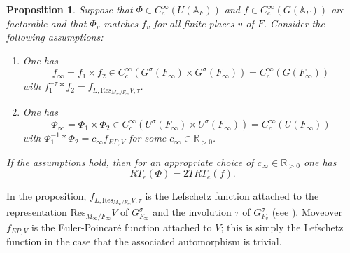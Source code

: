 \documentclass[12pt]{amsart}
\newtheorem{prop}[thm]{Proposition}
\theoremstyle{remark}
\numberwithin{equation}{section}
\newcommand{\A}{\mathbb{A}}
\newcommand{\RR}{\mathbb{R}}
\theoremstyle{definition}
\numberwithin{equation}{subsection}
\begin{document}
\begin{prop} \label{prop-form-compar} Suppose that $\Phi \in C_{c}^{\infty}(U(\A_F))$ and
$f \in C_c^{\infty}(G(\A_F))$ are factorable and that $\Phi_v$ matches $f_v$ for all finite places $v$ of $F$.
 Consider the following assumptions:
\begin{enumerate}
\item
One has
$$
f_{\infty}=f_1 \times f_2  \in C^{\infty}_c(G^{\sigma}(F_{\infty}) \times G^{\sigma}(F_{\infty}))= C_c^{\infty}(G(F_{\infty}))
$$
with $f_1^{-\tau}*f_2=f_{L,\mathrm{Res}_{M_{\infty}/F_{\infty}}V,\tau}$.

\item One has
$$
\Phi_{\infty}=\Phi_1 \times \Phi_2 \in C^{\infty}_c(U^{\sigma}(F_{\infty}) \times U^{\sigma}(F_{\infty}))=C_c^{\infty}(U(F_{\infty}))
$$
with $\Phi_1^{-1}*\Phi_2=c_{\infty}f_{EP,V}$ for some $c_{\infty} \in \RR_{>0}$.
\end{enumerate}
If the assumptions hold, then for an appropriate choice of $c_{\infty} \in \RR_{>0}$ one has
$$
RT_e(\Phi)=2TRT_e(f).
$$
\end{prop}
\noindent In the proposition, $f_{L,\mathrm{Res}_{M_{\infty}/F_{\infty}}V,\tau}$ is the Lefschetz function attached to the representation $\mathrm{Res}_{M_{\infty}/F_{\infty}}V$ of $G^{\sigma}_{F_{\infty}}$ and the involution $\tau$ of $G^{\sigma}_{F_v}$ (see \cite[Proposition 8.4]{BLS}). Moveover $f_{EP,V}$ is the Euler-Poincar\'e  function attached to $V$; this is simply the Lefschetz function in the case that the associated automorphism is trivial.
\end{document}
